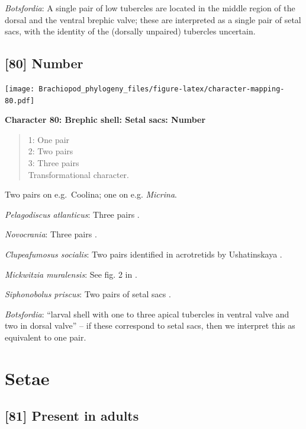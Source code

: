\documentclass[openany]{book}
\theoremstyle{definition}
\theoremstyle{definition}
\theoremstyle{definition}
\theoremstyle{remark}
\begin{document}
\emph{Botsfordia}: A single pair of low tubercles are \citep[ state
``may be'']{Ushatinskaya2016Revisionof} located in the middle region of
the dorsal and the ventral brephic valve; these are interpreted as a
single pair of setal sacs, with the identity of the (dorsally unpaired)
tubercles uncertain.

\hypertarget{number}{%
\subsection*{{[}80{]} Number}\label{number}}

\texttt{[image: Brachiopod\_phylogeny\_files/figure-latex/character-mapping-80.pdf]}

\textbf{Character 80: Brephic shell: Setal sacs: Number}

\begin{quote}
1: One pair\\
2: Two pairs\\
3: Three pairs\\
Transformational character.
\end{quote}

Two pairs on e.g.~Coolina; one on e.g. \emph{Micrina}.

\emph{Pelagodiscus atlanticus}: Three pairs
\citep{Carlson1995Phylogeneticrelationships}.

\emph{Novocrania}: Three pairs
\citep{Carlson1995Phylogeneticrelationships}.

\emph{Clupeafumosus socialis}: Two pairs identified in acrotretids by
Ushatinskaya \citeyearpar{Ushatinskaya2016Protegulumand}.

\emph{Mickwitzia muralensis}: See fig. 2 in
\citet{Balthasar2009Thebrachiopod}.

\emph{Siphonobolus priscus}: Two pairs of setal sacs
\citep{Popov2009Earlyontogeny}.

\emph{Botsfordia}: ``larval shell with one to three apical tubercles in
ventral valve and two in dorsal valve''
\citep{Williams2000BrachiopodaLinguliformea} -- if these correspond to
setal sacs, then we interpret this as equivalent to one pair.

\hypertarget{setae}{%
\section{Setae}\label{setae}}

\hypertarget{present-in-adults}{%
\subsection*{{[}81{]} Present in adults}\label{present-in-adults}}
\end{document}
